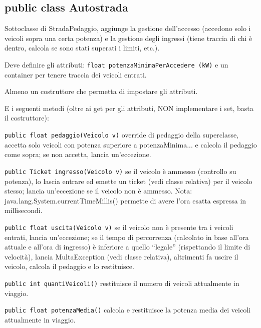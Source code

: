 \documentclass[a4paper]{article}
\begin{document}
\subsection*{public class Autostrada}

Sottoclasse di StradaPedaggio, aggiunge la gestione dell'accesso (accedono 
solo i veicoli sopra una certa potenza) e la gestione degli ingressi (tiene 
traccia di chi \`e dentro, calcola se sono stati superati i limiti, etc.).

Deve definire gli attributi: \texttt{float 
potenzaMinimaPerAccedere (kW)} e un container per tenere traccia dei veicoli 
entrati.

Almeno un costruttore che permetta di impostare gli attributi.

E i seguenti metodi (oltre ai get per gli attributi, NON implementare i set, 
basta il costruttore):

\begin{compactitem}
\item \texttt{public float pedaggio(Veicolo v)} override di pedaggio della 
superclasse, accetta solo veicoli con potenza superiore a potenzaMinima... e 
calcola il pedaggio come sopra; se non accetta, lancia un'eccezione.

\item \texttt{public Ticket ingresso(Veicolo v)} se il veicolo \`e ammesso
(controllo su potenza), lo lascia entrare ed emette un ticket (vedi classe relativa) per il 
veicolo stesso; lancia un'eccezione se il veicolo non \`e ammesso.
Nota: java.lang.System.currentTimeMillis() permette di avere l'ora esatta espressa 
in millisecondi.

\item \texttt{public float uscita(Veicolo v)} se il veicolo non \`e presente tra 
i veicoli entrati, lancia un'eccezione; se il tempo di percorrenza (calcolato in base
all'ora attuale e all'ora di ingresso) \`e inferiore a 
quello ``legale'' (rispettando il limite di velocit\`a), lancia MultaException (vedi classe 
relativa), altrimenti fa uscire il veicolo, calcola il pedaggio e lo restituisce.


\item \texttt{public int quantiVeicoli()} restituisce il numero di veicoli 
attualmente in viaggio.

\item \texttt{public float potenzaMedia()} calcola e restituisce la potenza 
media dei veicoli attualmente in viaggio.


\end{compactitem} 
\end{document}
